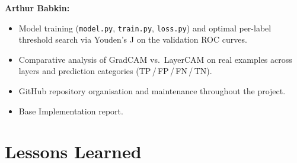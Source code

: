 \documentclass[12pt]{article}
\begin{document}
\textbf{Arthur Babkin:}
\begin{itemize}[leftmargin=*]
    \item Model training (\texttt{model.py}, \texttt{train.py}, \texttt{loss.py}) and optimal per-label threshold search via Youden's J on the validation ROC curves.
    \item Comparative analysis of GradCAM vs.\ LayerCAM on real examples across layers and prediction categories (TP\,/\,FP\,/\,FN\,/\,TN).
    \item GitHub repository organisation and maintenance throughout the project.
    \item Base Implementation report.
\end{itemize}

\section{Lessons Learned}
\end{document}
